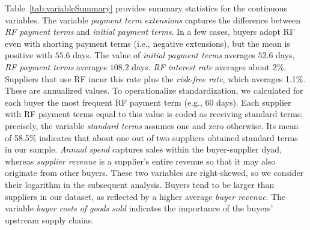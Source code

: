 \documentclass[a4paper,11pt]{article}
\renewcommand{\~}[1]{\tilde{#1}}
\renewcommand{\-}[1]{\overline{#1}}
\begin{document}
Table~\ref{tab:variableSummary} provides summary statistics for the continuous variables. The variable \textit{payment term extensions} captures the difference between \textit{RF payment terms} and \textit{initial payment terms}. In a few cases, buyers adopt RF even with shorting payment terms (i.e., negative extensions), but the mean is positive with $55.6$ days. The value of \textit{initial payment terms} averages $52.6$ days, \textit{RF payment terms} averages $108.2$ days. \textit{RF interest rate} averages about 2\%. Suppliers that use RF incur this rate plus the \textit{risk-free rate}, which averages 1.1\%. These are annualized values. To operationalize standardization, we calculated for each buyer the most frequent RF payment term (e.g., 60 days). Each supplier with RF payment terms equal to this value is coded as receiving standard terms; precisely, the variable \textit{standard terms} assumes one and zero otherwise. Its mean of 58.5\% indicates that about one out of two suppliers obtained standard terms in our sample. \textit{Annual spend} captures sales within the buyer-supplier dyad, whereas \textit{supplier revenue} is a supplier's entire revenue so that it may also originate from other buyers. These two variables are right-skewed, so we consider their logarithm in the subsequent analysis. Buyers tend to be larger than suppliers in our dataset, as reflected by a higher average \textit{buyer revenue}. The variable \textit{buyer costs of goods sold} indicates the importance of the buyers' upstream supply chains.%
\end{document}

